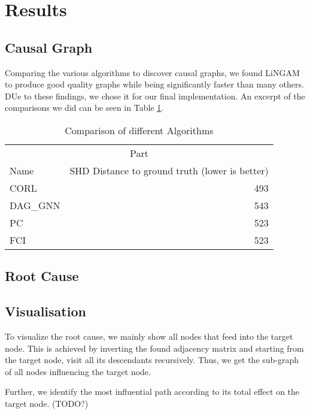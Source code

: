 \documentclass{article}
\begin{document}
    \section{Results} %

    \subsection{Causal Graph}

    Comparing the various algorithms to discover causal graphs, we found LiNGAM to produce good quality graphs while being significantly faster than many others. DUe to these findings, we chose it for our final implementation. An excerpt of the comparisons we did can be seen in Table \ref{comparisonSHD}.

    \begin{table}
		\caption{Comparison of different Algorithms}
		\label{comparisonSHD}
		\centering
		\begin{tabular}{lr}
			\toprule
			\multicolumn{2}{c}{Part}                   \\
			\cmidrule(r){1-2}
			Name     & SHD Distance to ground truth (lower is better)  \\
			\midrule
			CORL  & 493       \\
			DAG\_GNN & 543    \\
			PC & 523     \\
            FCI  & 523 \\
			\bottomrule
		\end{tabular}
	\end{table}
    
    \subsection{Root Cause}
    
    
    
    \subsection{Visualisation}

    To visualize the root cause, we mainly show all nodes that feed into the target node. This is achieved by inverting the found adjacency matrix and starting from the target node, visit all its descendants recursively. Thus, we get the sub-graph of all nodes influencing the target node. 

    Further, we identify the most influential path according to its total effect on the target node. (TODO?) 
    
\end{document}
